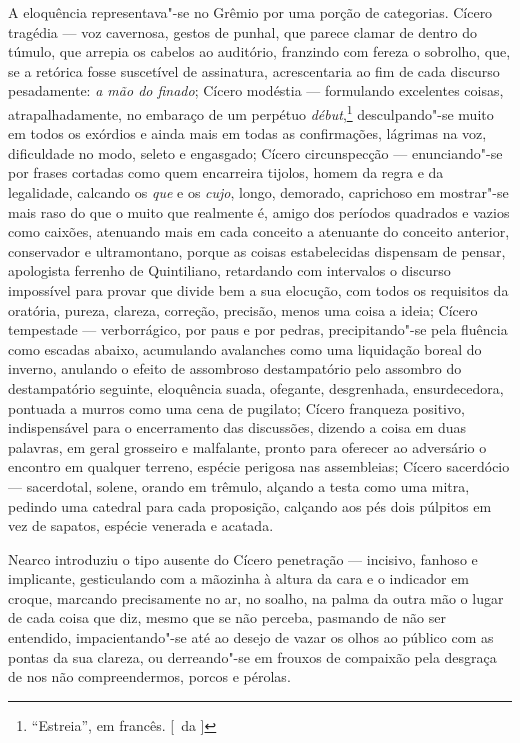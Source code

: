 A eloquência representava"-se no Grêmio por uma
porção de categorias. Cícero tragédia --- voz cavernosa, gestos de
punhal, que parece clamar de dentro do túmulo, que arrepia os cabelos
ao auditório, franzindo com fereza o sobrolho, que, se a retórica fosse
suscetível de assinatura, acrescentaria ao fim de cada discurso
pesadamente: \textit{a mão do finado}; Cícero modéstia --- formulando excelentes
coisas, atrapalhadamente, no embaraço de um perpétuo \textit{début},\footnote{ ``Estreia'', 
em francês. [~da ]} desculpando"-se muito em todos os exórdios e ainda mais em todas as
confirmações, lágrimas na voz, dificuldade no modo, seleto e engasgado;
Cícero circunspecção --- enunciando"-se por frases cortadas como quem
encarreira tijolos, homem da regra e da legalidade, calcando os \textit{que} e
os \textit{cujo}, longo, demorado, caprichoso em mostrar"-se mais raso do que o
muito que realmente é, amigo dos períodos quadrados e vazios como
caixões, atenuando mais em cada conceito a atenuante do conceito
anterior, conservador e ultramontano, porque as coisas estabelecidas
dispensam de pensar, apologista ferrenho de Quintiliano, retardando com
intervalos o discurso impossível para provar que divide bem a sua
elocução, com todos os requisitos da oratória, pureza, clareza,
correção, precisão, menos uma coisa a ideia; Cícero tempestade --- 
verborrágico, por paus e por pedras, precipitando"-se pela fluência
como escadas abaixo, acumulando avalanches como uma liquidação boreal
do inverno, anulando o efeito de assombroso destampatório pelo assombro
do destampatório seguinte, eloquência suada, ofegante, desgrenhada,
ensurdecedora, pontuada a murros como uma cena de pugilato; Cícero
franqueza positivo, indispensável para o encerramento das discussões,
dizendo a coisa em duas palavras, em geral grosseiro e malfalante,
pronto para oferecer ao adversário o encontro em qualquer terreno,
espécie perigosa nas assembleias; Cícero sacerdócio --- sacerdotal,
solene, orando em trêmulo, alçando a testa como uma mitra, pedindo uma
catedral para cada proposição, calçando aos pés dois púlpitos em vez de
sapatos, espécie venerada e acatada. 

Nearco introduziu o tipo ausente
do Cícero penetração --- incisivo, fanhoso e implicante, gesticulando
com a mãozinha à altura da cara e o indicador em croque, marcando
precisamente no ar, no soalho, na palma da outra mão o lugar de cada
coisa que diz, mesmo que se não perceba, pasmando de não ser entendido,
impacientando"-se até ao desejo de vazar os olhos ao público com as
pontas da sua clareza, ou derreando"-se em frouxos de compaixão pela
desgraça de nos não compreendermos, porcos e pérolas. 


